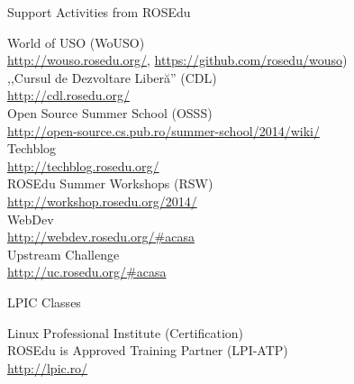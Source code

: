 \documentclass{paper}
\begin{document}
\begin{frame}{Support Activities from ROSEdu}
  \begin{center}
    {\small
      \pause World of USO (WoUSO) \\
      \url{http://wouso.rosedu.org/}, \url{https://github.com/rosedu/wouso}) \\
      \vspace{0.3cm}
      \pause ,,Cursul de Dezvoltare Liberă'' (CDL) \\
      \url{http://cdl.rosedu.org/} \\
      \vspace{0.3cm}
      \pause Open Source Summer School (OSSS) \\
      \url{http://open-source.cs.pub.ro/summer-school/2014/wiki/} \\
      \vspace{0.3cm}
      \pause Techblog \\
      \url{http://techblog.rosedu.org/} \\
      \vspace{0.3cm}
      \pause ROSEdu Summer Workshops (RSW) \\
      \url{http://workshop.rosedu.org/2014/} \\
      \vspace{0.3cm}
      \pause WebDev \\
      \url{http://webdev.rosedu.org/\#acasa} \\
      \vspace{0.3cm}
      \pause Upstream Challenge \\
      \url{http://uc.rosedu.org/\#acasa}
    }
  \end{center}
\end{frame}

\begin{frame}{LPIC Classes}
  \begin{center}
    {\Large
      \pause Linux Professional Institute (Certification) \\
      \vspace{0.3cm}
      \pause ROSEdu is Approved Training Partner (LPI-ATP) \\
      \vspace{0.3cm}
      \pause \url{http://lpic.ro/}
    }
  \end{center}
\end{frame}
\end{document}
